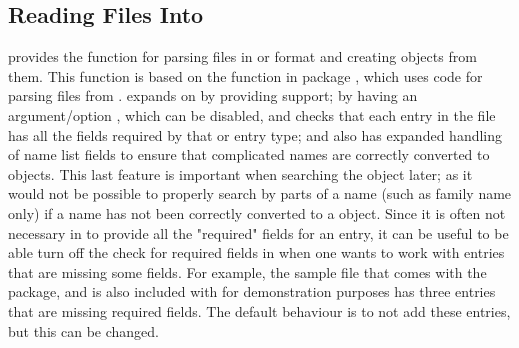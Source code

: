 \documentclass[article]{jss}\usepackage[]{graphicx}\usepackage[]{color}
\newcommand{\ourpkg}{\pkg{RefManageR}}
\begin{document}
\subsection[Reading .bib Files Into R]{Reading  Files Into \R{}} 
\ourpkg{} provides the function  for parsing  files in \Biblatex{} or \Bibtex{} format and creating  objects from them.  This function is based on the  function in package  \citep{Rbibtex}, which uses code for parsing \Bibtex{} files from \citet{bibparser}.   expands on  by providing \Biblatex{} support; by having an argument/option , which can be disabled, and checks that each entry in the file has all the fields required by that \Biblatex{} or \Bibtex{} entry type; and also has expanded handling of name list fields to ensure that complicated names are correctly converted to  objects.  This last feature is important when searching the  object later; as it would not be possible to properly search by parts of a name (such as family name only) if a name has not been correctly converted to a  object.  Since it is often not necessary in \Biblatex{} to provide all the "required" fields for an entry, it can be useful to be able turn off the check for required fields in \R{} when one wants to work with entries that are missing some fields.  For example, the sample  file that comes with the \Biblatex{} package, and is also included with \ourpkg{} for demonstration purposes has three entries that are missing required fields.  The default behaviour is to not add these entries, but this can be changed.
\end{document}
